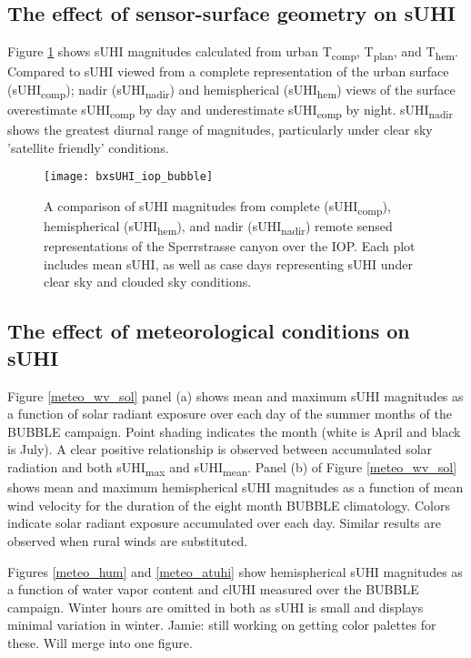 \begin{bibunit}
\subsection{The effect of sensor-surface geometry on sUHI}

Figure \ref{bx_suhi_compare} shows sUHI magnitudes calculated from urban T\textsubscript{comp}, T\textsubscript{plan}, and T\textsubscript{hem}. Compared to sUHI viewed from a complete representation of the urban surface (sUHI\textsubscript{comp}); nadir (sUHI\textsubscript{nadir}) and hemispherical (sUHI\textsubscript{hem}) views of the surface overestimate sUHI\textsubscript{comp} by day and underestimate sUHI\textsubscript{comp} by night. sUHI\textsubscript{nadir} shows the greatest diurnal range of magnitudes, particularly under clear sky 'satellite friendly' conditions. 

\begin{figure}[H]
	\centering
	\texttt{[image: bxsUHI\_iop\_bubble]}
	\caption{A comparison of sUHI magnitudes from complete (sUHI\textsubscript{comp}), hemispherical (sUHI\textsubscript{hem}), and nadir (sUHI\textsubscript{nadir}) remote sensed representations of the Sperrstrasse canyon over the IOP. Each plot includes mean sUHI, as well as case days representing sUHI under clear sky and clouded sky conditions.}
	\label{bx_suhi_compare}
\end{figure}

\subsection{The effect of meteorological conditions on sUHI}

Figure \ref{meteo_wv_sol} panel (a) shows mean and maximum sUHI magnitudes as a function of solar radiant exposure over each day of the summer months of the BUBBLE campaign. Point shading indicates the month (white is April and black is July). A clear positive relationship is observed between accumulated solar radiation and both sUHI\textsubscript{max} and sUHI\textsubscript{mean}. Panel (b) of Figure \ref{meteo_wv_sol} shows mean and maximum hemispherical sUHI magnitudes as a function of mean wind velocity for the duration of the eight month BUBBLE climatology. Colors indicate solar radiant exposure accumulated over each day. Similar results are observed when rural winds are substituted.

Figures \ref{meteo_hum} and \ref{meteo_atuhi} show hemispherical sUHI magnitudes as a function of water vapor content and clUHI measured over the BUBBLE campaign. Winter hours are omitted in both as sUHI is small and displays minimal variation in winter. Jamie: still working on getting color palettes for these. Will merge into one figure. 


\end{bibunit}
